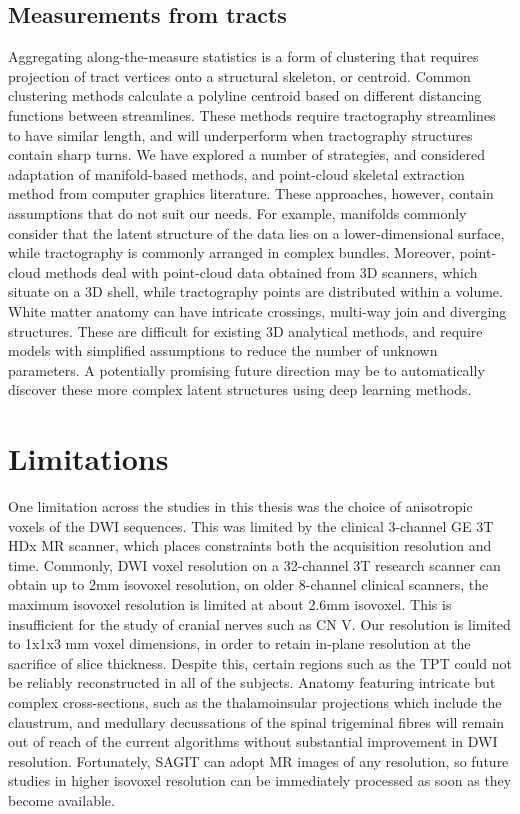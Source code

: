 \subsection{Measurements from tracts}
Aggregating along-the-measure statistics is a form of clustering that requires projection of tract vertices onto a structural skeleton, or centroid. Common clustering methods calculate a polyline centroid based on different distancing functions between streamlines. These methods require tractography streamlines to have similar length, and will underperform when tractography structures contain sharp turns. We have explored a number of strategies, and considered adaptation of manifold-based methods, and point-cloud skeletal extraction method from computer graphics literature. These approaches, however, contain assumptions that do not suit our needs. For example, manifolds commonly consider that the latent structure of the data lies on a lower-dimensional surface, while tractography is commonly arranged in complex bundles. Moreover, point-cloud methods deal with point-cloud data obtained from 3D scanners, which situate on a 3D shell, while tractography points are distributed within a volume. White matter anatomy can have intricate crossings, multi-way join and diverging structures. These are difficult for existing 3D analytical methods, and require models with simplified assumptions to reduce the number of unknown parameters. A potentially promising future direction may be to automatically discover these more complex latent structures using deep learning methods.

\section{Limitations}

One limitation across the studies in this thesis was the choice of anisotropic voxels of the DWI sequences. This was limited by the clinical 3-channel GE 3T HDx MR scanner, which places constraints both the acquisition resolution and time. Commonly, DWI voxel resolution on a 32-channel 3T research scanner can obtain up to 2mm isovoxel resolution, on older 8-channel clinical scanners, the maximum isovoxel resolution is limited at about 2.6mm isovoxel. This is insufficient for the study of cranial nerves such as CN V. Our resolution is limited to 1x1x3 mm voxel dimensions, in order to retain in-plane resolution at the sacrifice of slice thickness. Despite this, certain regions such as the TPT could not be reliably reconstructed in all of the subjects. Anatomy featuring intricate but complex cross-sections, such as the thalamoinsular projections which include the claustrum, and medullary decussations of the spinal trigeminal fibres will remain out of reach of the current algorithms without substantial improvement in DWI resolution. Fortunately, SAGIT can adopt MR images of any resolution, so future studies in higher isovoxel resolution can be immediately processed as soon as they become available. 


